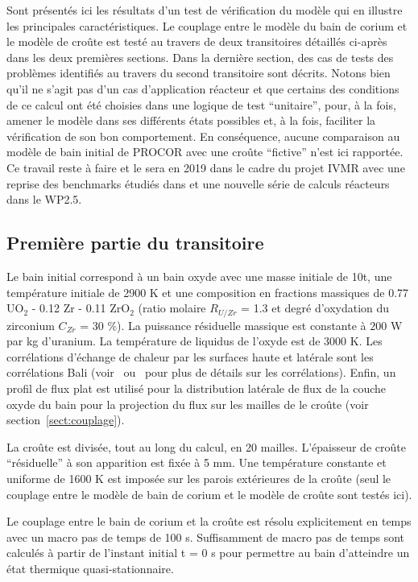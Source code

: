 Sont présentés ici les résultats d'un test de vérification du modèle qui en illustre les principales caractéristiques. Le couplage entre le modèle du bain de corium et le modèle de croûte est testé au travers de deux transitoires détaillés ci-après dans les deux premières sections. Dans la dernière section, des cas de tests des problèmes identifiés au travers du second transitoire sont décrits. Notons bien qu'il ne s'agit pas d'un cas d'application réacteur et que certains des conditions de ce calcul ont été choisies dans une logique de test ``unitaire'', pour, à la fois, amener le modèle dans ses différents états possibles et, à la fois, faciliter la vérification de son bon comportement. En conséquence, aucune comparaison au modèle de bain initial de PROCOR avec une croûte ``fictive'' n'est ici rapportée. Ce travail reste à faire et le sera en 2019 dans le cadre du projet IVMR avec une reprise des benchmarks étudiés dans \cite{Carenini2019} et une nouvelle série de calculs réacteurs dans le WP2.5.

\subsection{Première partie du transitoire}
Le bain initial correspond à un bain oxyde avec une masse initiale de 10t, une température initiale de 2900 K et une composition en fractions massiques de 0.77 UO$_2$ - 0.12 Zr - 0.11 ZrO$_2$ (ratio molaire $R_{U/Zr}$ = 1.3 et degré  d'oxydation du zirconium $C_{Zr}$ = 30 \%). La puissance résiduelle massique est constante à $200$ W par kg d'uranium. La température de liquidus de l'oxyde est de 3000 K. Les corrélations d'échange de chaleur par les surfaces haute et latérale sont les corrélations Bali (voir~\cite{Bonnet1999} ou~\cite{Tourniaire2009a} pour plus de détails sur les corrélations). Enfin, un profil de flux plat est utilisé pour la distribution latérale de flux de la couche oxyde du bain pour la projection du flux sur les mailles de le croûte (voir section~\ref{sect:couplage}).

La croûte est divisée, tout au long du calcul, en 20 mailles. L'épaisseur de croûte ``résiduelle'' à son apparition est fixée à 5 mm. Une température constante et uniforme de 1600 K est imposée sur les parois extérieures de la croûte (seul le couplage entre le modèle de bain de corium et le modèle de croûte sont testés ici).

Le couplage entre le bain de corium et la croûte est résolu explicitement en temps avec un macro pas de temps de 100 s. Suffisamment de macro pas de temps sont calculés à partir de l'instant initial t = 0 s pour permettre au bain d'atteindre un état thermique quasi-stationnaire.

